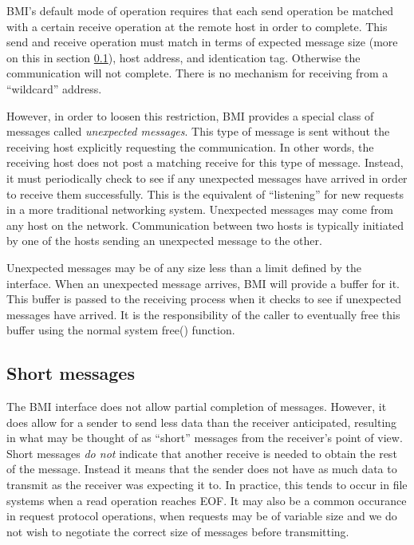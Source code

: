\documentclass[11pt]{article}
\begin{document}
BMI's default mode of operation requires that each send operation be
matched with a certain receive operation at the remote host in order to
complete.  This send and receive operation must match in terms of expected
message size (more on this in section \ref{sec:short}), host address,
and identication tag.  Otherwise the communication will not complete.
There is no mechanism for receiving from a ``wildcard'' address.

However, in order to loosen this restriction, 
BMI provides a special class of messages called \emph{unexpected
messages}.   This type of message is sent without the receiving host 
explicitly requesting the communication. 
In other
words, the receiving host does not post a matching receive for this
type of message.  Instead, it must periodically check to see if any
unexpected messages have arrived in order to receive them successfully.
This is the equivalent of ``listening'' for new requests in a more
traditional
networking system.  Unexpected messages may come from any host on the
network.  Communication between two hosts is typically initiated
by one of the hosts sending an unexpected message to the other. 

Unexpected messages may be of any size less than a limit defined by the
interface.  When an unexpected message arrives, BMI will provide a
buffer for it.  This buffer is passed to the receiving process when it
checks to see if unexpected messages have arrived.  It is the
responsibility of the caller to eventually free this buffer using
the normal system free() function.

\subsection{Short messages}
\label{sec:short}

The BMI interface does not allow partial completion of messages.
However, it does allow for a sender to send less data than
the receiver anticipated, resulting in what may be thought of as
``short'' messages from the receiver's point of view.  Short
messages \emph{do not} indicate that another receive is needed to
obtain the rest of the message.  Instead it means that the
sender does not have as much data to transmit as the receiver was
expecting it to.  In practice, this tends to occur in file systems
when a read operation reaches EOF.  It may also be a common
occurance in request protocol operations, when requests may be of
variable size and we do not wish to negotiate the correct size of
messages before transmitting.
\end{document}
